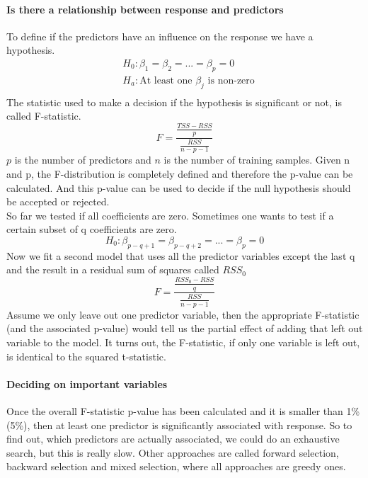\documentclass[../document.tex]{subfiles}
\begin{document}
	\paragraph{Is there a relationship between response and predictors}
	To define if the predictors have an influence on the response we have a hypothesis.
	\begin{equation}
	\begin{split}
		&H_{0}:\beta_{1}=\beta_{2}=...=\beta_{p}=0\\
		&H_{a}:\text{At least one }\beta_{j}\text{ is non-zero}\\
	\end{split}
	\end{equation}
	The statistic used to make a decision if the hypothesis is significant or not, is called F-statistic.
	\begin{equation}
		F = \frac{\frac{TSS-RSS}{p}}{\frac{RSS}{n-p-1}}
	\end{equation}
	\(p\) is the number of predictors and \(n\) is the number of training samples.
	Given n and p, the F-distribution is completely defined and therefore the p-value can be calculated. And this p-value can be used to decide if the null hypothesis should be accepted or rejected.\\
	So far we tested if all coefficients are zero. Sometimes one wants to test if a certain subset of q coefficients are zero.
	\begin{equation}
		H_{0}: \beta_{p-q+1}=\beta_{p-q+2}=...=\beta_{p}=0
	\end{equation}
	Now we fit a second model that uses all the predictor variables except the last q and the result in a residual sum of squares called \(RSS_{0}\)
	\begin{equation}
		F = \frac{\frac{RSS_{0}-RSS}{q}}{\frac{RSS}{n-p-1}}
	\end{equation}
	Assume we only leave out one predictor variable, then the appropriate F-statistic (and the associated p-value) would tell us the partial effect of adding that left out variable to the model. It turns out, the F-statistic, if only one variable is left out, is identical to the squared t-statistic.
	\paragraph{Deciding on important variables}
	Once the overall F-statistic p-value has been calculated and it is smaller than 1\% (5\%), then at least one predictor is significantly associated with response. So to find out, which predictors are actually associated, we could do an exhaustive search, but this is really slow. Other approaches are called forward selection, backward selection and mixed selection, where all approaches are greedy ones.
\end{document}
